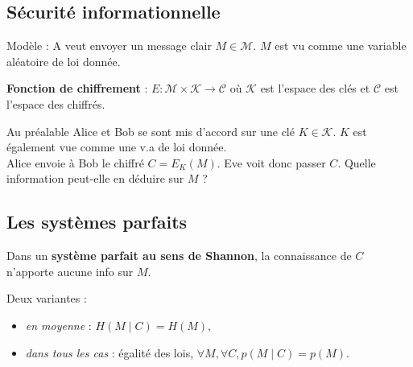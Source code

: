 \subsection{Sécurité informationnelle}

	\begin{center}
	\end{center}
	
	Modèle : A veut envoyer un message clair $M \in \mathcal{M}$. $M$ est vu comme une variable aléatoire de loi donnée.
	
	\begin{defn}
		\textbf{Fonction de chiffrement} : $E \colon \mathcal{M} \times \mathcal{K} \to \mathcal{C}$ où $\mathcal{K}$ est l'espace des clés et $\mathcal{C}$ est l'espace des chiffrés.
	\end{defn}
	
	Au préalable Alice et Bob se sont mis d'accord sur une clé $K \in \mathcal{K}$.
	$K$ est également vue comme une v.a de loi donnée.\\
	
	Alice envoie à Bob le chiffré $C = E_K(M)$.
	Eve voit donc passer $C$.
	Quelle information peut-elle en déduire sur $M$ ?
	

\subsection{Les systèmes parfaits}
	
	\begin{defn}
		Dans un \textbf{système parfait au sens de Shannon}, la connaissance de $C$ n'apporte aucune info sur $M$.
	\end{defn}
	
	Deux variantes :
	\begin{itemize}
		\item[\textbullet] \textit{en moyenne} : $H(M \mid C) = H(M)$,
		\item[\textbullet] \textit{dans tous les cas} : égalité des lois, $\forall M, \forall C, p(M \mid C) = p(M)$.
	\end{itemize}
	
